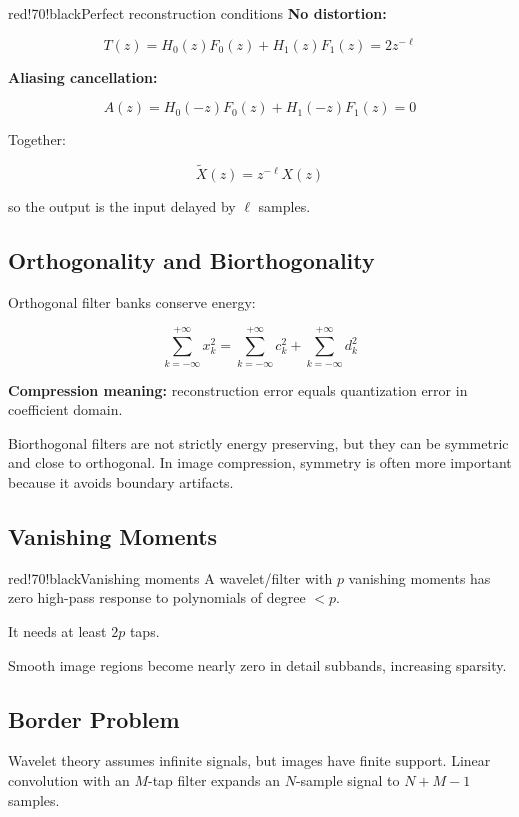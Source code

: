 \begin{calloutbox}{red!70!black}{Perfect reconstruction conditions}
\textbf{No distortion:}

\[
T(z)=H_0(z)F_0(z)+H_1(z)F_1(z)=2z^{-\ell}
\]

\textbf{Aliasing cancellation:}

\[
A(z)=H_0(-z)F_0(z)+H_1(-z)F_1(z)=0
\]

Together:

\[
\tilde{X}(z)=z^{-\ell}X(z)
\]

so the output is the input delayed by $\ell$ samples.
\end{calloutbox}

\subsection{Orthogonality and Biorthogonality}

Orthogonal filter banks conserve energy:

\[
\sum_{k=-\infty}^{+\infty}x_k^2
=
\sum_{k=-\infty}^{+\infty}c_k^2
+
\sum_{k=-\infty}^{+\infty}d_k^2
\]

\textbf{Compression meaning:} reconstruction error equals quantization error in coefficient domain.

Biorthogonal filters are not strictly energy preserving, but they can be symmetric and close to orthogonal. In image compression, symmetry is often more important because it avoids boundary artifacts.

\subsection{Vanishing Moments}

\begin{calloutbox}{red!70!black}{Vanishing moments}
A wavelet/filter with $p$ vanishing moments has zero high-pass response to polynomials of degree $<p$.

It needs at least $2p$ taps.

Smooth image regions become nearly zero in detail subbands, increasing sparsity.
\end{calloutbox}

\subsection{Border Problem}

Wavelet theory assumes infinite signals, but images have finite support. Linear convolution with an $M$-tap filter expands an $N$-sample signal to $N+M-1$ samples.


